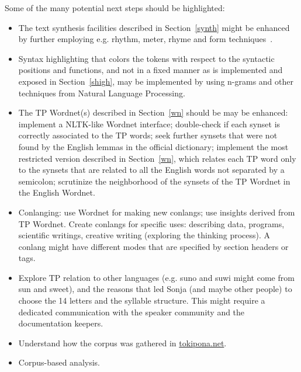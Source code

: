 Some of the many potential next steps should be highlighted:
\begin{itemize}
  \item The text synthesis facilities described in
    Section~\ref{synth} might be enhanced by further employing e.g.
    rhythm, meter, rhyme and form techniques~\cite{wikiPoetry}.
  \item Syntax highlighting that colors the tokens with respect
    to the syntactic positions and functions, and not in a fixed manner
    as is implemented and exposed in Section~\ref{shigh},
    may be implemented by using n-grams and
    other techniques from Natural Language Processing.
  \item The TP Wordnet(s) described in Section~\ref{wn} should be may
    be enhanced:
    implement a NLTK-like Wordnet interface; double-check if each synset
    is correctly associated to the TP words; seek further synsets
    that were not found by the English lemmas in the official
    dictionary; implement the most restricted version described in
    Section~\ref{wn}, which relates each TP word only to the synsets
    that are related to all the English words not separated by a
    semicolon; scrutinize the neighborhood of the synsets of the TP
    Wordnet in the English Wordnet.
  \item Conlanging: use Wordnet for making new conlangs;
    use insights derived from TP Wordnet.
    Create conlangs for specific uses:
    describing data, programs,
    scientific writings, creative writing
    (exploring the thinking process).
    A conlang might have different modes that are
    specified by section headers or tags. 
  \item Explore TP relation to other languages
    (e.g. suno and suwi might come from sun and sweet),
    and the reasons that led Sonja (and maybe other people)
    to choose the 14 letters and the syllable structure.
    This might require a dedicated communication with the
    speaker community and the documentation keepers.
  \item Understand how the corpus was gathered in \url{tokipona.net}.
  \item Corpus-based analysis.

\end{itemize}
